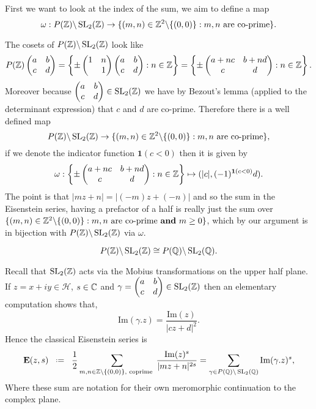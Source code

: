 First we want to look at the index of the sum, we aim to define a map
	\[\omega: P(\Z) \backslash \SL_2(\Z) \to  \{(m,n)\in \Z^2\backslash\{(0,0)\} : m,n \text{ are co-prime}\}.\]

	The cosets of \(P(\Z) \backslash \SL_2(\Z)\) look like
	\[P(\Z)\begin{pmatrix}
		a & b \\ c& d
	\end{pmatrix} = \left\{\pm\begin{pmatrix}
		1 & n \\&1
	\end{pmatrix}\begin{pmatrix}
	a & b \\ c& d
	\end{pmatrix} : n\in \Z\right\} = \left\{\pm\begin{pmatrix}
	a+nc & b+nd \\ c & d
	\end{pmatrix} : n\in \Z\right\}.\]
	Moreover because \(\begin{pmatrix}
		a & b \\ c& d
	\end{pmatrix}\in \SL_2(\Z)\) we have by Bezout's lemma (applied to the determinant expression) that \(c\) and \(d\) are co-prime. Therefore there is a well defined map 
	\[P(\Z) \backslash \SL_2(\Z) \to  \{(m,n)\in \Z^2\backslash\{(0,0)\} : m,n \text{ are co-prime}\},\]
	if we denote the indicator function \(\mathbf{1}(c<0)\) then it is given by 
	\[\omega : \left\{\pm\begin{pmatrix}
		a+nc & b+nd \\ c & d
	\end{pmatrix} : n\in \Z\right\}\mapsto (|c|,(-1)^{\mathbf{1}(c<0)}d).\]
	The point is that \(|mz + n| = |(-m)z + (-n)|\) and so the sum in the Eisenstein series, having a prefactor of a half is really just the sum over \( \{(m,n)\in \Z^2\backslash\{(0,0)\} : m,n \text{ are co-prime \textbf{and} }m\geq 0\}\), which by our argument is in bijection with \(P(\Z) \backslash \SL_2(\Z)\) via \(\omega\).
	

	

\begin{Lemma}
	\[P(\Z) \backslash \SL_2(\Z) \cong P(\Q) \backslash \SL_2(\Q). \]
\end{Lemma}
Recall that \(\SL_2(\Z)\) acts via the Mobius transformations on the upper half plane. If \(z= x+ iy \in \mathcal{H}\), \(s\in \C\) and \(\gamma = \begin{pmatrix}
	a & b\\ c& d \end{pmatrix}\in \SL_2(\Z)\) then an elementary computation shows that,
\[\mathrm{Im}(\gamma.z) = \frac{\mathrm{Im}(z)}{|cz + d|^{2}}.\]
Hence the classical Eisenstein series is
\[\mathbf{E}(z, s) \defeq \frac{1}{2} \sum_{m,n\in \Z\backslash \{(0,0)\}, \text{ coprime }} \frac{\mathrm{Im}(z)^{s}}{|mz+n|^{2s}} = \sum_{\gamma\in P(\Q)\backslash \SL_2(\Q)} \mathrm{Im}(\gamma.z)^{s},\]
Where these sum are notation for their own meromorphic continuation to the complex plane. 

